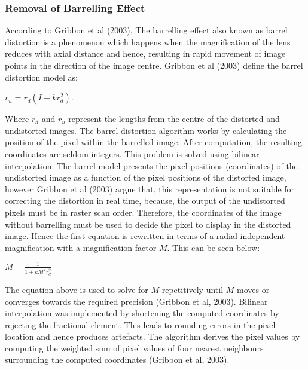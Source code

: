 \documentclass[a4paper, 12pt]{article}
\begin{document}
\subsubsection{ Removal of Barrelling Effect}

According to Gribbon et al (2003), The barrelling effect also known as barrel distortion is a phenomenon which happens when the magnification of the lens reduces with axial distance and hence, resulting in rapid movement of image points in the direction of the image centre. Gribbon et al (2003) define the barrel distortion model as: 
\begin{center}
 $r_{u} = r_{d}(I+kr^{2}_{d})$.
\end{center}

Where $r_{d}$ and $r_{u}$  represent the lengths from the centre of the distorted and undistorted images. The barrel distortion algorithm works by calculating the position of the pixel within the barrelled image. After computation, the resulting coordinates are seldom integers. This problem is solved using bilinear interpolation. The barrel model presents the pixel positions (coordinates) of the undistorted image as a function of the pixel positions of the distorted image, however Gribbon et al (2003) argue that, this representation is not suitable for correcting the distortion in real time, because, the output of the undistorted pixels must be in raster scan order. Therefore, the coordinates of the image without barrelling must be used to decide the pixel to display in the distorted image. Hence the first equation is rewritten in terms of a radial independent magnification with a magnification factor $M$. This can be seen below: 

\begin{center}
$M = \frac{1}{1+kM^2r^{2}_{d}}$
\end{center}

The equation above is used to solve for $M$ repetitively until $M$ moves or converges towards the required precision (Gribbon et al, 2003). Bilinear interpolation was implemented by shortening the computed coordinates by rejecting the fractional element. This leads to rounding errors in the pixel location and hence produces artefacts. The algorithm derives the pixel values by computing the weighted sum of pixel values of four nearest neighbours surrounding the computed coordinates (Gribbon et al, 2003). 
\end{document}

